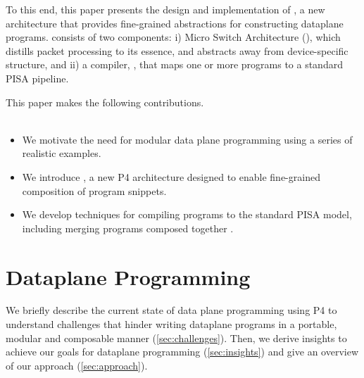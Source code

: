 \documentclass[letterpaper,twocolumn,10pt]{article}
\begin{document}
To this end, this paper presents the design and implementation of
\ulang, a new architecture that provides fine-grained abstractions for
constructing dataplane programs. \ulang consists of two components: i)
Micro Switch Architecture (\uarch), which distills packet processing
to its essence, and abstracts away from device-specific structure, and
ii) a compiler, \ucomp, that maps one or more \uarch programs to a
standard PISA pipeline.
\\

This paper makes the following contributions.\\
\\
\begin{itemize}
\item We motivate the need for modular data plane programming using a
  series of realistic examples.
\item We introduce \uarch, a new P4 architecture designed to enable
  fine-grained composition of program snippets.
\item We develop techniques for compiling \uarch programs to the
  standard PISA model, including merging programs composed together 
  .
\end{itemize}





\section{Dataplane Programming}
\label{sec:background}

We briefly describe the current state of data plane programming using
P4 to understand challenges that hinder writing dataplane programs in
a portable, modular and composable manner (\cref{sec:challenges}).
Then, we derive insights to achieve our goals for dataplane
programming \ulang (\cref{sec:insights}) and give an overview of our
approach (\cref{sec:approach}).
\end{document}
